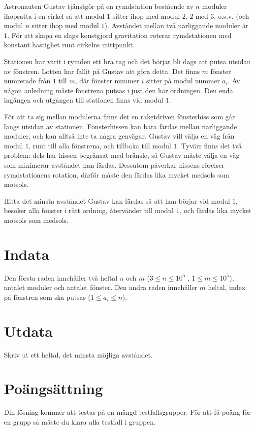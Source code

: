 Astronauten Gustav tjänstgör på en rymdstation bestående av $n$ moduler ihopsatta i en cirkel så att modul $1$ sitter ihop med modul $2$, $2$ med $3$, o.s.v. (och modul $n$ sitter ihop med modul $1$).
Avståndet mellan två närliggande moduler är $1$. För att skapa en slags konstgjord gravitation roterar rymdstationen med konstant hastighet runt cirkelns mittpunkt.

Stationen har varit i rymden ett bra tag och det börjar bli dags att putsa utsidan av fönstren. 
Lotten har fallit på Gustav att göra detta. Det finns $m$ fönster numrerade från $1$ till $m$, där fönster nummer $i$ sitter på modul nummer $a_i$. 
Av någon anledning måste fönstrena putsas i just den här ordningen. Den enda ingången och utgången till stationen finns vid modul $1$.

För att ta sig mellan modulerna finns det en raketdriven fönsterhiss som går längs utsidan av stationen.
Fönsterhissen kan bara färdas mellan närliggande moduler, och kan alltså inte ta några genvägar.
Gustav vill välja en väg från modul $1$, runt till alla fönstrena, och tillbaka till modul $1$. 
Tyvärr finns det två problem: dels har hissen begränsat med bränsle, så Gustav måste välja en väg som minimerar avståndet han färdas. 
Dessutom påverkar hissens rörelser rymdstationens rotation, därför måste den färdas lika mycket medsols som motsols.

Hitta det minsta avståndet Gustav kan färdas så att han börjar vid modul $1$, besöker alla fönster i rätt ordning, återvänder till modul $1$, och färdas lika mycket motsols som medsols.

\section*{Indata}
Den första raden innehåller två heltal $n$ och $m$ ($3 \leq n \leq 10^5$ , $1 \leq m \leq 10^5$), antalet moduler och antalet fönster.
Den andra raden innehåller $m$ heltal, index på fönstren som ska putsas ($1 \leq a_i \leq n$).

\section*{Utdata}
Skriv ut ett heltal, det minsta möjliga avståndet.

\section*{Poängsättning}
Din lösning kommer att testas på en mängd testfallsgrupper. För att få poäng för en grupp så måste du klara alla testfall i gruppen.

